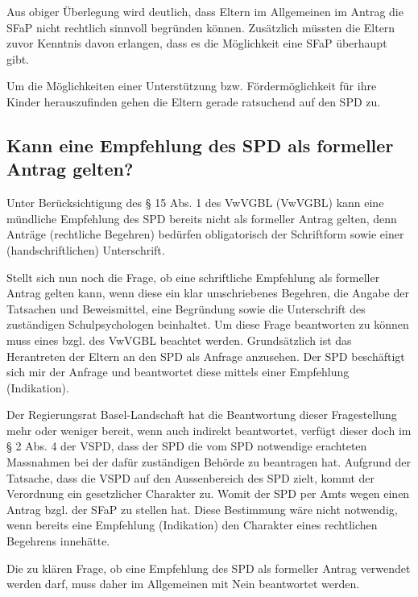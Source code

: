 \documentclass[paper=a4, onesite]{scrreprt}
\newcounter{rz}
\newcommand{\Rz}{\addtocounter{rz}{1}\marginpar{\texttt{(\textit{\arabic{rz}})}}}
\begin{document}
\Rz Aus obiger Überlegung  wird deutlich, dass Eltern im Allgemeinen im Antrag die \ac{SFaP} nicht rechtlich sinnvoll begründen können. Zusätzlich müssten die Eltern zuvor Kenntnis davon erlangen, dass es die Möglichkeit eine \ac{SFaP} überhaupt gibt.\\

\Rz Um die Möglichkeiten einer Unterstützung bzw. Fördermöglichkeit für ihre Kinder herauszufinden gehen die Eltern gerade ratsuchend auf den \acl{SPD} zu. 

\subsection{Kann eine Empfehlung des \ac{SPD} als formeller Antrag gelten?}
\Rz Unter Berücksichtigung des § 15 Abs. 1 des \acl{VwVGBL} (\ac{VwVGBL}) kann eine mündliche Empfehlung des \ac{SPD} bereits nicht als formeller Antrag gelten, denn Anträge (rechtliche Begehren) bedürfen obligatorisch der Schriftform sowie einer (handschriftlichen) Unterschrift.\\

\Rz Stellt sich nun noch die Frage, ob eine schriftliche Empfehlung als formeller Antrag gelten kann, wenn diese ein klar umschriebenes Begehren, die Angabe der Tatsachen und Beweismittel, eine Begründung sowie die Unterschrift des zuständigen Schulpsychologen beinhaltet. Um diese Frage beantworten zu können muss eines bzgl. des 
\ac{VwVGBL} beachtet werden. Grundsätzlich ist das Herantreten der Eltern an den \acl{SPD} als Anfrage anzusehen. Der \ac{SPD} beschäftigt sich mir der Anfrage und beantwortet diese mittels einer Empfehlung (Indikation).\\

\Rz Der Regierungsrat Basel-Landschaft hat die Beantwortung dieser Fragestellung mehr oder weniger bereit, wenn auch indirekt beantwortet, verfügt dieser doch im § 2 Abs. 4 der \acl{VSPD}, dass der \acl{SPD} die vom \ac{SPD} notwendige erachteten Massnahmen bei der dafür zuständigen Behörde zu beantragen hat. Aufgrund der Tatsache, dass die \ac{VSPD} auf den Aussenbereich des \ac{SPD} zielt, kommt der Verordnung  ein gesetzlicher Charakter zu. Womit der \ac{SPD} per Amts wegen einen Antrag bzgl. der \acl{SFaP} zu stellen hat. Diese Bestimmung wäre nicht notwendig, wenn bereits eine Empfehlung (Indikation) den Charakter eines rechtlichen Begehrens innehätte.\\

\Rz Die zu klären Frage, ob eine Empfehlung des \ac{SPD} als formeller Antrag verwendet werden darf, muss daher im Allgemeinen mit Nein beantwortet werden.
\end{document}
